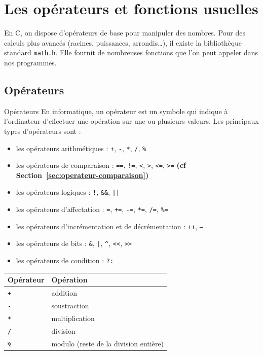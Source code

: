 
\section{Les opérateurs et fonctions usuelles}

En C, on dispose d’opérateurs de base pour manipuler des nombres.
Pour des calculs plus avancés (racines, puissances, arrondis…), il existe la bibliothèque standard \texttt{math.h}.
Elle fournit de nombreuses fonctions que l’on peut appeler dans nos programmes.
\subsection{Opérateurs}
\begin{UPSTIinfor}{Opérateurs}
	En informatique, un opérateur est un symbole qui indique à l’ordinateur d’effectuer une opération sur une ou plusieurs valeurs. Les principaux types d’opérateurs sont :
	\begin{itemize}
		\item les opérateurs arithmétiques : \texttt{+}, \texttt{-}, \texttt{*}, \texttt{/}, \texttt{\%}
		\item les opérateurs de comparaison : \texttt{==}, \texttt{!=}, \texttt{<}, \texttt{>}, \texttt{<=}, \texttt{>=}  \textbf{(cf Section~\ref{sec:operateur-comparaison})} 
		\item les opérateurs logiques : \texttt{!}, \texttt{\&\&}, \texttt{||}
		\item les opérateurs d’affectation : \texttt{=}, \texttt{+=}, \texttt{-=}, \texttt{*=}, \texttt{/=}, \texttt{\%=}
		\item les opérateurs d’incrémentation et de décrémentation : \texttt{++}, \texttt{--}
		\item les opérateurs de bits : \texttt{\&}, \texttt{|}, \texttt{\^}, \texttt{<<}, \texttt{>>}
		\item les opérateurs de condition : \texttt{?:}
	\end{itemize}
\end{UPSTIinfor}
\begin{minipage}{0.4\textwidth}
	\begin{center}
	\begin{tabular}{|l|l|}
		\hline
		Opérateur   & Opération                             \\
		\hline
		\texttt{+}  & addition                              \\
		\texttt{-}  & soustraction                          \\
		\texttt{*}  & multiplication                        \\
		\texttt{/}  & division                              \\
		\texttt{\%} & modulo (reste de la division entière) \\
		\hline
	\end{tabular}
\end{center}
\end{minipage}

